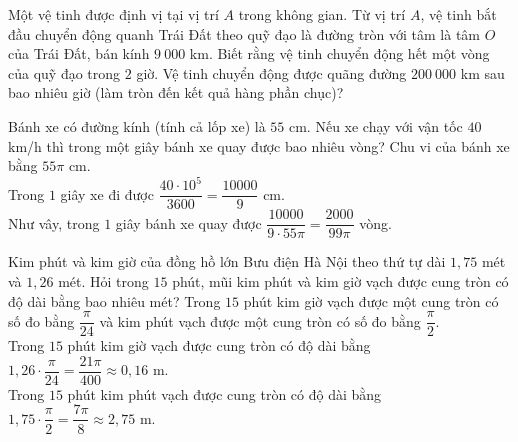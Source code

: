 \begin{vd}[MĐ3]%
	Một vệ tinh được định vị tại vị trí $A$ trong không gian. Từ vị trí $A$, vệ tinh bắt đầu chuyển động quanh Trái Đất theo quỹ đạo là đường tròn với tâm là tâm $O$ của Trái Đất, bán kính $9~000$ km. Biết rằng vệ tinh chuyển động hết một vòng của quỹ đạo trong $2$ giờ. Vệ tinh chuyển động được quãng đường $200~000$ km sau bao nhiêu giờ (làm tròn đến kết quả hàng phần chục)?
\end{vd}

\begin{bt}%
	Bánh xe có đường kính (tính cả lốp xe) là $55$ cm. Nếu xe chạy với vận tốc $40$ km/h thì trong một giây bánh xe quay được bao nhiêu vòng?
	\loigiai
	{
		Chu vi của bánh xe bằng $55\pi$ cm.\\
		Trong $1$ giây xe đi được $\dfrac{40\cdot 10^5}{3600} = \dfrac{10000}{9}$ cm.\\
		Như vây, trong $1$ giây bánh xe quay được $\dfrac{10000}{9 \cdot 55\pi} = \dfrac{2000}{99\pi}$ vòng.
	}
\end{bt}

\begin{bt}%
	Kim phút và kim giờ của đồng hồ lớn Bưu điện Hà Nội theo thứ tự dài $1{,}75$ mét và $1{,}26$ mét. Hỏi trong $15$ phút, mũi kim phút và kim giờ vạch được cung tròn có độ dài bằng bao nhiêu mét?
	\loigiai
	{
		Trong $15$ phút kim giờ vạch được một cung tròn có số đo bằng $\dfrac{\pi}{24}$ và kim phút vạch được một cung tròn có số đo bằng $\dfrac{\pi}{2}$.\\
		Trong $15$ phút kim giờ vạch được cung tròn có độ dài bằng $1{,}26\cdot \dfrac{\pi}{24} = \dfrac{21\pi}{400} \approx 0{,}16$ m.\\
		Trong $15$ phút kim phút vạch được cung tròn có độ dài bằng $1{,}75 \cdot \dfrac{\pi}{2} = \dfrac{7\pi}{8} \approx 2{,}75$ m.
	}
\end{bt}


